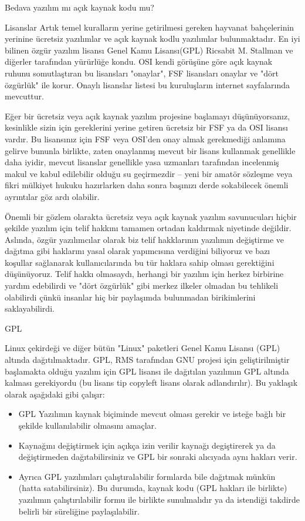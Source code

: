 \begin{section}{Bedava yazılım mı açık kaynak kodu mu?}
\begin{subsection}{Lisanslar}
Artık temel kuralların yerine getirilmesi gereken hayvanat bahçelerinin yerinine ücretsiz yazılımlar ve  açık kaynak kodlu yazılımlar bulunmaktadır. En iyi bilinen özgür yazılım lisansı Genel Kamu Lisansı(GPL)  Ricsabit M. Stallman ve diğerler tarafından yürürlüğe kondu. OSI kendi görüşüne göre açık kaynak ruhunu somutlaştıran bu lisansları "onaylar", FSF  lisansları onaylar ve "dört özgürlük" ile korur. Onaylı lisanslar listesi bu kuruluşların internet sayfalarında mevcuttur.

Eğer bir ücretsiz veya açık kaynak yazılım projesine başlamayı düşünüyorsanız, kesinlikle sizin için  gereklerini yerine getiren ücretsiz bir FSF ya da OSI lisansı vardır. Bu lisansınız için FSF veya OSI'den onay almak gerekmediği anlamına gelirve bununla birlikte, zaten onaylanmış mevcut bir lisans kullanmak genellikle daha iyidir, mevcut lisanslar genellikle yasa uzmanları tarafından incelenmiş makul ve kabul edilebilir olduğu su geçirmezdir -- yeni bir amatör sözleşme veya fikri mülkiyet hukuku hazırlarken daha sonra başınızı derde sokabilecek önemli ayrıntılar göz ardı olabilir.

Önemli bir gözlem olarakta ücretsiz veya açık kaynak yazılım savunucuları hiçbir şekilde  yazılım için telif hakkını tamamen ortadan kaldırmak niyetinde değildir. Aslında, özgür yazılımcılar olarak biz telif hakklarının yazılımın değiştirme ve dağıtma gibi haklarını yasal olarak yapımcısına verdiğini biliyoruz ve bazı koşullar sağlanarak kullanıcılarında bu tür haklara sahip olması gerektiğini düşünüyoruz. Telif hakkı olmasaydı, herhangi bir yazılım için herkez birbirine yardım edebilirdi ve "dört özgürlük" gibi merkez ilkeler olmadan bu tehlikeli olabilirdi çünkü insanlar hiç bir paylaşımda bulunmadan birikimlerini saklayabilirdi.
\end{subsection}
\begin{subsection}{GPL}

Linux çekirdeği ve diğer bütün "Linux" paketleri Genel Kamu Lisansı (GPL) altında dağıtılmaktadır. GPL, RMS tarafından GNU projesi için geliştirilmiştir başlamakta olduğu yazılım için GPL lisansı ile dağıtılan yazılımın GPL altında kalması gerekiyordu (bu lisans tip copyleft lisans olarak adlandırılır). Bu yaklaşık olarak aşağıdaki gibi çalışır:

\begin{itemize}
 \item GPL Yazılımın kaynak biçiminde mevcut olması gerekir ve isteğe bağlı bir şekilde kullanılabilir olmasını amaçlar.
 \item Kaynağını değiştirmek için açıkça izin verilir kaynağı degiştirerek ya da değiştirmeden dağıtabilirsiniz ve GPL bir sonraki alıcıyada aynı hakları verir.
 \item Ayrıca  GPL yazılımları çalıştıralabilir  formlarda bile dağıtmak münkün (hatta satabilirsiniz). Bu durumda, kaynak kodu (GPL hakları ile birlikte) yazılımın çalıştırılabilir formu ile birlikte sunulmalıdır ya da istendiği takdirde belirli bir süreliğine paylaşılabilir.


\end{itemize}
\end{subsection}
\end{section}
